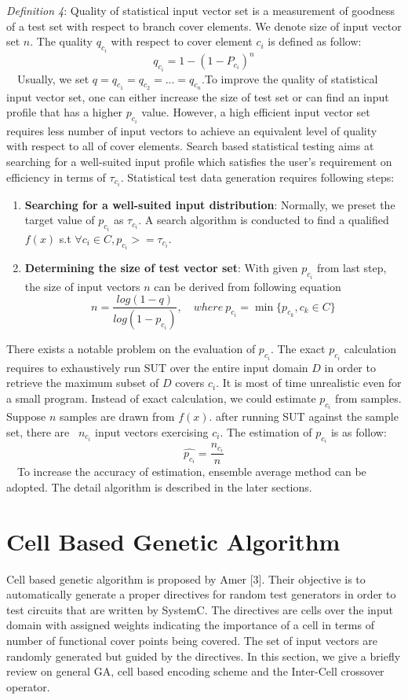 \documentclass[conference]{IEEEtran}
\begin{document}
\noindent\emph{Definition 4}: Quality of statistical input vector set is a measurement of goodness of a test set with respect to branch cover elements. We denote size of input vector set \(n\). The quality \(q_{c_i}\) with respect to cover element \(c_i\)  is defined as follow: \[q_{c_i} = 1-(1-P_{c_i})^n\]
   \ \ Usually, we set \(q = q_{c_1} = q_{c_2} = ... = q_{c_n}\).To improve the quality of statistical input vector set, one can either increase the size of test set or can find an input profile that has a higher \(p_{c_i}\) value. However, a high efficient input vector set requires less number of input vectors to achieve an equivalent level of quality with respect to all of cover elements. Search based statistical testing aims at searching for a well-suited input profile which satisfies the user's requirement on efficiency in terms of \(\tau_{c_i}\). Statistical test data generation requires following steps:
 \begin{enumerate}
 	\item \textbf{Searching for a well-suited input distribution}: Normally, we preset the target value of \(p_{c_i}\) as \(\tau_{c_i}\). A search algorithm is conducted to find a qualified \(f(x)\) s.t \(\forall c_i \in C, p_{c_i} >= \tau_{c_i}\).
 	\item \textbf{Determining the size of test vector set}: With given \(p_{c_i}\) from last step, the size of input vectors \(n\) can be derived from following equation \[n = \frac{log(1-q)}{log(1-p_{c_i})},\quad where \ p_{c_i} = \min\{p_{c_k}, c_k \in C\}\]   
 \end{enumerate}
 
 There exists a notable problem on the evaluation of \(p_{c_i}\). The exact \(p_{c_i}\) calculation requires to exhaustively run SUT over the entire input domain \(D\) in order to retrieve the maximum subset of \(D\) covers \(c_i\). It is most of time unrealistic even for a small program. Instead of exact calculation, we could estimate \(p_{c_i}\) from samples. Suppose \(n\) samples are drawn from \(f(x)\). after running SUT against the sample set, there are \ \(n_{c_i}\) input vectors exercising \(c_i\). The estimation of \(p_{c_i}\) is as follow: \[\hat{p_{c_i}} = \frac{n_{c_i}}{n}\] \ \ To increase the accuracy of estimation, ensemble average method can be adopted. The detail algorithm is described in the later sections.
 
\section{Cell Based Genetic Algorithm}
 Cell based genetic algorithm is proposed by Amer [3]. Their objective is to automatically generate a proper directives for random test generators in order to test circuits that are written by SystemC. The directives are cells over the input domain with assigned weights indicating the importance of a cell in terms of number of functional cover points being covered. The set of input vectors are randomly generated but guided by the directives. In this section, we give a briefly review on general GA, cell based encoding scheme and the Inter-Cell crossover operator.
\end{document}
